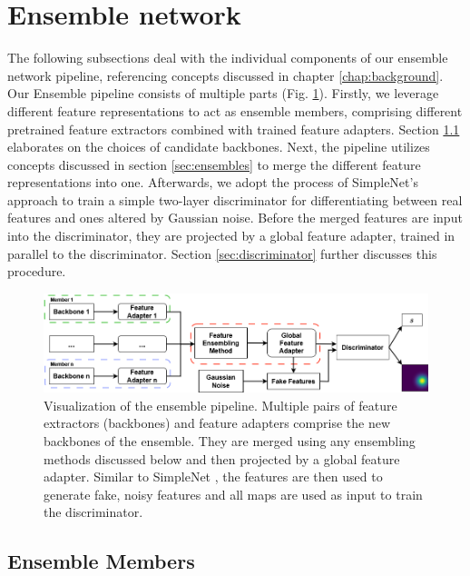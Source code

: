 \section{Ensemble network}
\label{sec:ourensemblenetwork}


The following subsections deal with the individual components of our ensemble network pipeline, referencing concepts discussed in chapter \ref{chap:background}. Our Ensemble pipeline 
consists of multiple parts (Fig. \ref{fig:ensemblepipeline}). Firstly, we leverage different feature representations to act as ensemble members, comprising 
different pretrained feature extractors combined with trained feature adapters. Section \ref{sec:ensemblecandidates} elaborates on the choices of candidate backbones. Next, the pipeline 
utilizes concepts discussed in section \ref{sec:ensembles} to merge the different feature representations into one. Afterwards, we adopt the process of SimpleNet's \cite{liu2023simplenet} 
approach to train a simple two-layer discriminator for differentiating between real features and ones altered by Gaussian noise. Before the merged features are input into the 
discriminator, they are projected by a global feature adapter, trained in parallel to the discriminator. Section \ref{sec:discriminator} further discusses this procedure.

\begin{figure}[htbp]
    \centering
    \includegraphics[width=\textwidth]{figures/ensemblepipeline.png}
    \caption{Visualization of the ensemble pipeline. Multiple pairs of feature extractors (backbones) and feature adapters comprise the new backbones of the ensemble. They are 
            merged using any ensembling methods discussed below and then projected by a global feature adapter. Similar to SimpleNet \cite{liu2023simplenet}, the 
            features are then used to generate fake, noisy features and all maps are used as input to train the discriminator.}
    \label{fig:ensemblepipeline}
\end{figure}


\subsection{Ensemble Members}
\label{sec:ensemblecandidates}

